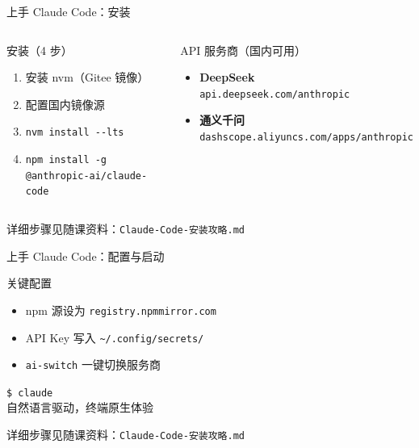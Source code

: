 \documentclass[aspectratio=169]{ctexbeamer}
\begin{document}
\begin{frame}{上手 Claude Code：安装}
\small

\begin{columns}[T]
\begin{block}{安装（4 步）}
\begin{enumerate}
  \setlength\itemsep{0pt}
  \item 安装 nvm（Gitee 镜像）
  \item 配置国内镜像源
  \item \texttt{nvm install {-}{-}lts}
  \item \texttt{npm install -g @anthropic-ai/claude-code}
\end{enumerate}
\end{block}

\begin{block}{API 服务商（国内可用）}
\begin{itemize}
  \setlength\itemsep{4pt}
  \item \textbf{DeepSeek}\\\footnotesize\texttt{api.deepseek.com/anthropic}
  \item \textbf{通义千问}\\\footnotesize\texttt{dashscope.aliyuncs.com/apps/anthropic}
\end{itemize}
\end{block}
\end{columns}

\vspace{0.5cm}

\begin{center}
\footnotesize
详细步骤见随课资料：\texttt{Claude-Code-安装攻略.md}
\end{center}
\end{frame}

\begin{frame}{上手 Claude Code：配置与启动}
\small

\begin{block}{关键配置}
\begin{itemize}
  \setlength\itemsep{6pt}
  \item npm 源设为 \texttt{registry.npmmirror.com}
  \item API Key 写入 \texttt{\textasciitilde/.config/secrets/}
  \item \texttt{ai-switch} 一键切换服务商
\end{itemize}
\end{block}

\vspace{0.6cm}

\begin{center}
\Large\texttt{\$ claude}\\[0.3cm]
\normalsize 自然语言驱动，终端原生体验
\end{center}

\vspace{0.4cm}

\begin{center}
\footnotesize
详细步骤见随课资料：\texttt{Claude-Code-安装攻略.md}
\end{center}
\end{frame}
\end{document}
